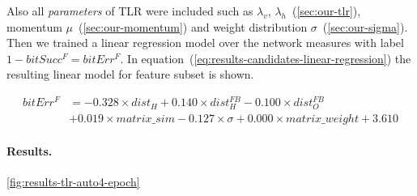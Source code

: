 Also all \emph{parameters} of TLR were included such as $\lambda_v$, $\lambda_h$~(\ref{sec:our-tlr}), momentum $\mu$~(\ref{sec:our-momentum}) and weight distribution $\sigma$~(\ref{sec:our-sigma}). Then we trained a linear regression model over the network measures with label $1-bitSucc^F = bitErr^F$. In equation~(\ref{eq:results-candidates-linear-regression}) the resulting linear model for feature subset is shown. %

\begin{align} 
\label{eq:results-candidates-linear-regression} 
bitErr^F &= 
- 0.328 \times dist_{H}
+ 0.140 \times dist_{H}^{FB}
- 0.100 \times dist_{O}^{FB} \nonumber \\
&+ 0.019 \times matrix\_sim
- 0.127 \times \sigma
+ 0.000 \times matrix\_weight
+ 3.610
\end{align}  

\paragraph{Results.}
\label{sec:results-candidates} 

\ref{fig:results-tlr-auto4-epoch} 


